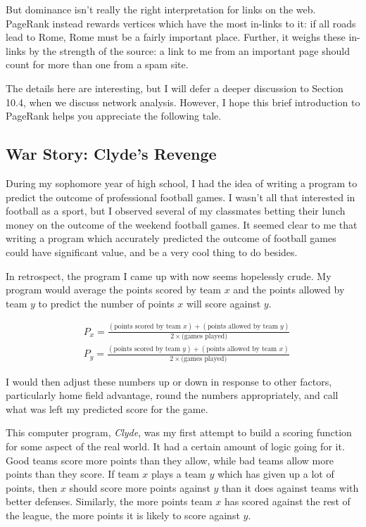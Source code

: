 \documentclass[10pt]{article}
\begin{document}
But dominance isn't really the right interpretation for links on the web. PageRank instead rewards vertices which have the most in-links to it: if all roads lead to Rome, Rome must be a fairly important place. Further, it weighs these in-links by the strength of the source: a link to me from an important page should count for more than one from a spam site.

The details here are interesting, but I will defer a deeper discussion to Section 10.4, when we discuss network analysis. However, I hope this brief introduction to PageRank helps you appreciate the following tale.

\subsection{War Story: Clyde's Revenge}

During my sophomore year of high school, I had the idea of writing a program to predict the outcome of professional football games. I wasn't all that interested in football as a sport, but I observed several of my classmates betting their lunch money on the outcome of the weekend football games. It seemed clear to me that writing a program which accurately predicted the outcome of football games could have significant value, and be a very cool thing to do besides.

In retrospect, the program I came up with now seems hopelessly crude. My program would average the points scored by team $x$ and the points allowed by team $y$ to predict the number of points $x$ will score against $y$.

\begin{align*}
& P_{x}=\frac{(\text{points scored by team } x)+(\text{points allowed by team } y)}{2 \times \text{(games played)}} \\
& P_{y}=\frac{(\text{points scored by team } y)+(\text{points allowed by team } x)}{2 \times \text{(games played)}}
\end{align*}

I would then adjust these numbers up or down in response to other factors, particularly home field advantage, round the numbers appropriately, and call what was left my predicted score for the game.

This computer program, \emph{Clyde}, was my first attempt to build a scoring function for some aspect of the real world. It had a certain amount of logic going for it. Good teams score more points than they allow, while bad teams allow more points than they score. If team $x$ plays a team $y$ which has given up a lot of points, then $x$ should score more points against $y$ than it does against teams with better defenses. Similarly, the more points team $x$ has scored against the rest of the league, the more points it is likely to score against $y$.
\end{document}

